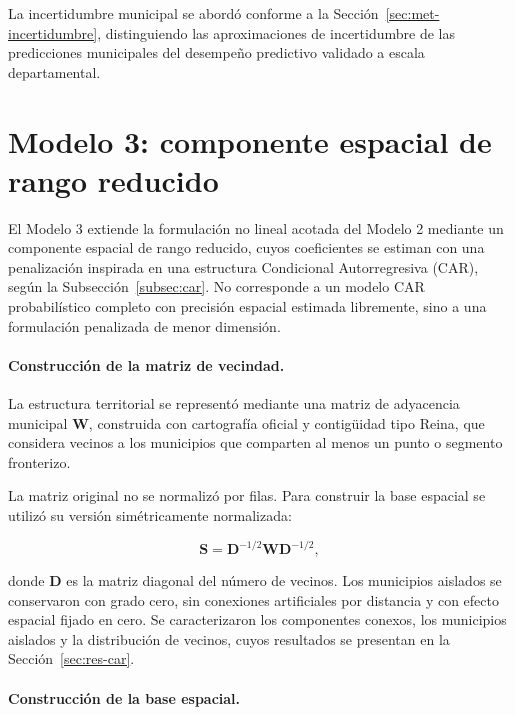 La incertidumbre municipal se abordó conforme a la Sección~\ref{sec:met-incertidumbre}, distinguiendo las aproximaciones de incertidumbre de las predicciones municipales del desempeño predictivo validado a escala departamental.



\section{Modelo 3: componente espacial de rango reducido}
\label{sec:met-car}

El Modelo 3 extiende la formulación no lineal acotada del Modelo 2 mediante un componente espacial de rango reducido, cuyos coeficientes se estiman con una penalización inspirada en una estructura Condicional Autorregresiva (CAR), según la Subsección~\ref{subsec:car}. No corresponde a un modelo CAR probabilístico completo con precisión espacial estimada libremente, sino a una formulación penalizada de menor dimensión.

\paragraph{Construcción de la matriz de vecindad.}

La estructura territorial se representó mediante una matriz de adyacencia municipal $\mathbf{W}$, construida con cartografía oficial y contigüidad tipo Reina, que considera vecinos a los municipios que comparten al menos un punto o segmento fronterizo.

La matriz original no se normalizó por filas. Para construir la base espacial se utilizó su versión simétricamente normalizada:

\begin{equation}
\mathbf{S}
=
\mathbf{D}^{-1/2}
\mathbf{W}
\mathbf{D}^{-1/2},
\label{eq:met-m3-normalizacion}
\end{equation}

donde $\mathbf{D}$ es la matriz diagonal del número de vecinos. Los municipios aislados se conservaron con grado cero, sin conexiones artificiales por distancia y con efecto espacial fijado en cero. Se caracterizaron los componentes conexos, los municipios aislados y la distribución de vecinos, cuyos resultados se presentan en la Sección~\ref{sec:res-car}.

\paragraph{Construcción de la base espacial.}

